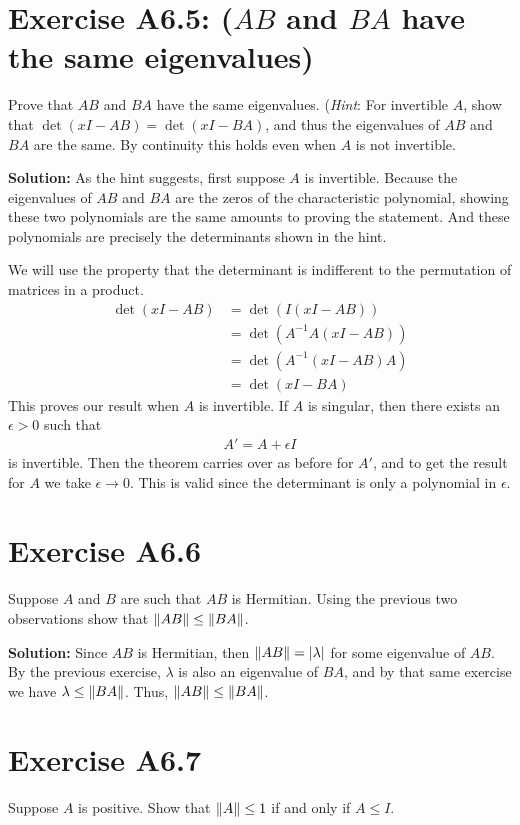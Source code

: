 \documentclass{book}
\begin{document}
\section*{Exercise A6.5: ($AB$ and $BA$ have the same eigenvalues)}
    Prove that $AB$ and $BA$ have the same eigenvalues. (\emph{Hint}: For invertible $A$, show that $\det(xI-AB) = \det(xI-BA)$, and thus the eigenvalues of $AB$ and $BA$ are the same. By continuity this holds even when $A$ is not invertible.
    
    \textbf{Solution:} As the hint suggests, first suppose $A$ is invertible. Because the eigenvalues of $AB$ and $BA$ are the zeros of the characteristic polynomial, showing these two polynomials are the same amounts to proving the statement. And these polynomials are precisely the determinants shown in the hint. 
    
    We will use the property that the determinant is indifferent to the permutation of matrices in a product.
    \begin{align}
        \det(xI-AB) &= \det(I(xI-AB)) \\
        &= \det(A^{-1}A(xI-AB)) \\
        &= \det(A^{-1}(xI-AB)A) \\
        &= \det(xI-BA)
    \end{align}
    This proves our result when $A$ is invertible. If $A$ is singular, then there exists an $\epsilon>0$ such that
    \begin{align}
        A' = A + \epsilon I 
    \end{align}
    is invertible. Then the theorem carries over as before for $A'$, and to get the result for $A$ we take $\epsilon\rightarrow 0$. This is valid since the determinant is only a polynomial in $\epsilon$.
    
\section*{Exercise A6.6}
    Suppose $A$ and $B$ are such that $AB$ is Hermitian. Using the previous two observations show that $\norm{AB}\leq\norm{BA}$.
    
    \textbf{Solution:} Since $AB$ is Hermitian, then $\norm{AB} = \abs{\lambda}$ for some eigenvalue of $AB$. By the previous exercise, $\lambda$ is also an eigenvalue of $BA$, and by that same exercise we have $\lambda \leq \norm{BA}$. Thus, $\norm{AB}
    \leq\norm{BA}$.
    
\section*{Exercise A6.7}
    Suppose $A$ is positive. Show that $\norm{A}\leq 1$ if and only if $A \leq I$.
    
\end{document}
